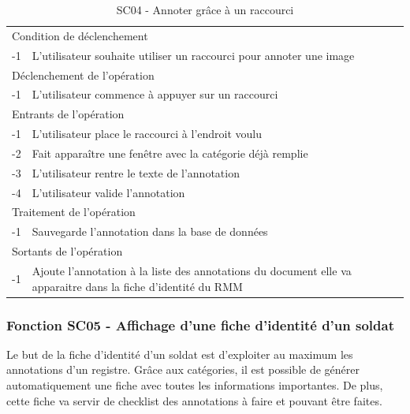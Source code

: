 \documentclass[a4paper]{article}
\begin{document}
\begin{table}[H]
  \centering
   \small
	\begin{tabular}{|c|p{12cm}|}
   		\hline
   			\rowcolor{lightgray}\multicolumn{2}{|c|}{\textbf{SC04 - Annoter grâce à un raccourci}} \\
   		\hline
   			\multicolumn{2}{|l|}{Condition de d\'eclenchement} \\
   		\hline
   			-1 & L’utilisateur souhaite utiliser un raccourci pour annoter une image\\
   		\hline
   			\multicolumn{2}{|l|}{D\'eclenchement de l'op\'eration} \\
   		\hline
   			-1 & L’utilisateur commence à appuyer sur un raccourci\\
   		\hline
   			\multicolumn{2}{|l|}{Entrants de l'op\'eration} \\
   		\hline
   			-1 & L’utilisateur place le raccourci à l’endroit voulu\\
			-2 & Fait apparaître une fenêtre avec la catégorie déjà remplie\\
			-3 & L’utilisateur rentre le texte de l’annotation\\
			-4 & L’utilisateur valide l’annotation\\
   		\hline
   			\multicolumn{2}{|l|}{Traitement de l'op\'eration} \\
  		\hline
   			-1 & Sauvegarde l’annotation dans la base de données\\
   		\hline
   			\multicolumn{2}{|l|}{Sortants de l'op\'eration} \\
   		\hline
   			-1 & Ajoute l’annotation à la liste des annotations du document elle va apparaitre dans la fiche d’identité du RMM\\
   		\hline
	\end{tabular}
  \caption{SC04 - Annoter grâce à un raccourci}
  \normalsize
  \label{tab:utiliser_raccourci}
\end{table}

\subsubsection{Fonction SC05 - Affichage d'une fiche d'identité d'un soldat}

Le but de la fiche d'identité d'un soldat est d'exploiter au maximum les annotations d'un registre. Gr\^ace aux cat\'egories, il est possible de g\'en\'erer automatiquement une fiche avec toutes les informations importantes. De plus, cette fiche va servir de checklist des annotations \`a faire et pouvant \^etre faites.\\
\end{document}
